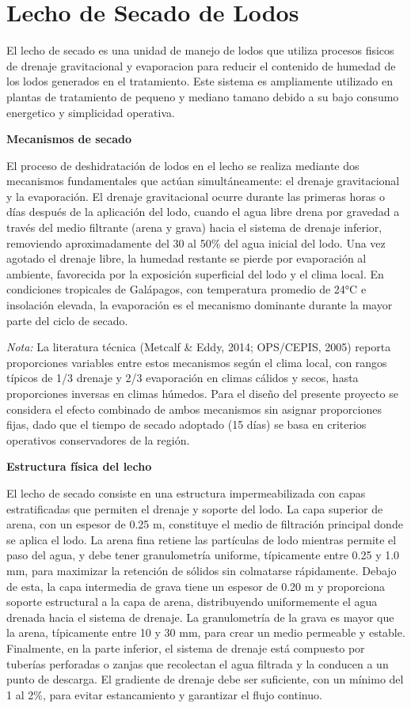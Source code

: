 \documentclass[12pt,a4paper]{article}
\begin{document}
\section{Lecho de Secado de Lodos}



El lecho de secado es una unidad de manejo de lodos que utiliza procesos fisicos de drenaje gravitacional y evaporacion para reducir el contenido de humedad de los lodos generados en el tratamiento. Este sistema es ampliamente utilizado en plantas de tratamiento de pequeno y mediano tamano debido a su bajo consumo energetico y simplicidad operativa.

\textbf{Mecanismos de secado}

El proceso de deshidratación de lodos en el lecho se realiza mediante dos mecanismos fundamentales que actúan simultáneamente: el drenaje gravitacional y la evaporación. El drenaje gravitacional ocurre durante las primeras horas o días después de la aplicación del lodo, cuando el agua libre drena por gravedad a través del medio filtrante (arena y grava) hacia el sistema de drenaje inferior, removiendo aproximadamente del 30 al 50\% del agua inicial del lodo. Una vez agotado el drenaje libre, la humedad restante se pierde por evaporación al ambiente, favorecida por la exposición superficial del lodo y el clima local. En condiciones tropicales de Galápagos, con temperatura promedio de 24°C e insolación elevada, la evaporación es el mecanismo dominante durante la mayor parte del ciclo de secado.

\textit{Nota:} La literatura técnica (Metcalf \& Eddy, 2014; OPS/CEPIS, 2005) reporta proporciones variables entre estos mecanismos según el clima local, con rangos típicos de 1/3 drenaje y 2/3 evaporación en climas cálidos y secos, hasta proporciones inversas en climas húmedos. Para el diseño del presente proyecto se considera el efecto combinado de ambos mecanismos sin asignar proporciones fijas, dado que el tiempo de secado adoptado (15 días) se basa en criterios operativos conservadores de la región.

\textbf{Estructura física del lecho}

El lecho de secado consiste en una estructura impermeabilizada con capas estratificadas que permiten el drenaje y soporte del lodo. La capa superior de arena, con un espesor de 0.25 m, constituye el medio de filtración principal donde se aplica el lodo. La arena fina retiene las partículas de lodo mientras permite el paso del agua, y debe tener granulometría uniforme, típicamente entre 0.25 y 1.0 mm, para maximizar la retención de sólidos sin colmatarse rápidamente. Debajo de esta, la capa intermedia de grava tiene un espesor de 0.20 m y proporciona soporte estructural a la capa de arena, distribuyendo uniformemente el agua drenada hacia el sistema de drenaje. La granulometría de la grava es mayor que la arena, típicamente entre 10 y 30 mm, para crear un medio permeable y estable. Finalmente, en la parte inferior, el sistema de drenaje está compuesto por tuberías perforadas o zanjas que recolectan el agua filtrada y la conducen a un punto de descarga. El gradiente de drenaje debe ser suficiente, con un mínimo del 1 al 2\%, para evitar estancamiento y garantizar el flujo continuo.
\end{document}
